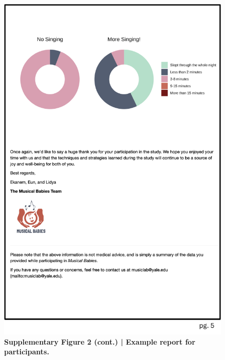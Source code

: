 \documentclass[
]{article}
\begin{document}
\begin{figure}[p]

{\centering \includegraphics[width=0.5\linewidth,]{../viz/s_figure2c} 

}

\caption{\textbf{Supplementary Figure 2 (cont.) | Example report for participants.}}\label{fig:supp fig 2c}
\end{figure}

\clearpage
\end{document}
